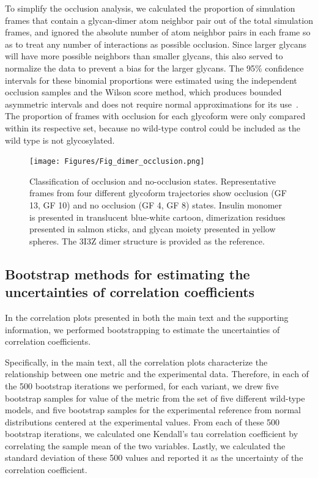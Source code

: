 \documentclass[9pt]{elife}
\begin{document}
To simplify the occlusion analysis, we calculated the proportion of simulation frames that contain a glycan-dimer atom neighbor pair out of the total simulation frames, and ignored the absolute number of atom neighbor pairs in each frame so as to treat any number of interactions as possible occlusion. Since larger glycans will have more possible neighbors than smaller glycans, this also served to normalize the data to prevent a bias for the larger glycans. The 95\% confidence intervals for these binomial proportions were estimated using the independent occlusion samples and the Wilson score method, which produces bounded asymmetric intervals and does not require normal approximations for its use~\cite{wilson1927score, newcombe1998intervals, wallis2013binomialscores}. The proportion of frames with occlusion for each glycoform were only compared within its respective set, because no wild-type control could be included as the wild type is not glycosylated.

\begin{figure}[H]
\centering
\texttt{[image: Figures/Fig\_dimer\_occlusion.png]}
\caption{Classification of occlusion and no-occlusion states. Representative frames from four different glycoform trajectories show occlusion (GF 13, GF 10) and no occlusion (GF 4, GF 8) states. Insulin monomer is presented in translucent blue-white cartoon, dimerization residues presented in salmon sticks, and glycan moiety presented in yellow spheres. The 3I3Z dimer structure is provided as the reference.}
\label{occlusion}
\end{figure}

\subsection{Bootstrap methods for estimating the uncertainties of correlation coefficients} \label{bootstrap}
In the correlation plots presented in both the main text and the supporting information, we performed bootstrapping to estimate the uncertainties of correlation coefficients. 

Specifically, in the main text, all the correlation plots characterize the relationship between one metric and the experimental data. Therefore, in each of the 500 bootstrap iterations we performed, for each variant, we drew five bootstrap samples for value of the metric from the set of five different wild-type models, and five bootstrap samples for the experimental reference from normal distributions centered at the experimental values. From each of these 500 bootstrap iterations, we calculated one Kendall's tau correlation coefficient by correlating the sample mean of the two variables. Lastly, we calculated the standard deviation of these 500 values and reported it as the uncertainty of the correlation coefficient. 
\end{document}
